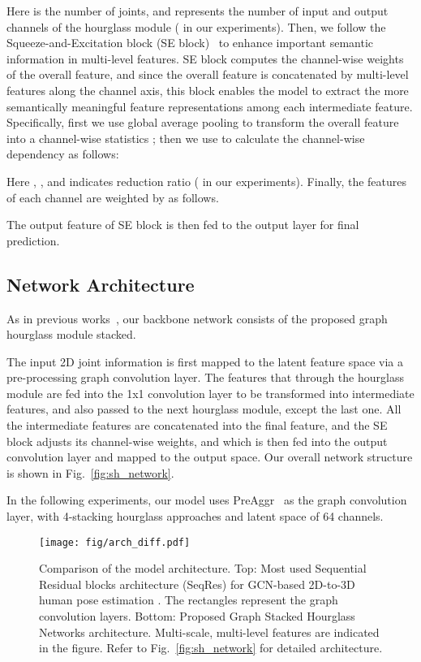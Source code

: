\documentclass[final]{cvpr}
\begin{document}
Here  is the number of joints, and  represents the number of input and output channels of the hourglass module ( in our experiments).
Then, we follow the Squeeze-and-Excitation block (SE block)~\cite{senet2018} to enhance important semantic information in multi-level features.
SE block computes the channel-wise weights of the overall feature, and since the overall feature is concatenated by multi-level features along the channel axis, 
this block enables the model to extract the more semantically meaningful feature representations among each intermediate feature.
Specifically, first we use global average pooling to transform the overall feature  into a channel-wise statistics ; then we use  to calculate the channel-wise dependency  as follows:

Here , , and  indicates reduction ratio ( in our experiments).
Finally, the features of each channel are weighted by  as follows.


The output feature of SE block  is then fed to the output layer for final prediction.


\subsection{Network Architecture}

As in previous works~\cite{Newell2016StackedHN, NIPS2017_8edd7215}, our backbone network consists of the proposed graph hourglass module stacked.

The input 2D joint information is first mapped to the latent feature space via a pre-processing graph convolution layer.
The features that through the hourglass module are fed into the 1x1 convolution layer to be transformed into intermediate features, and also passed to the next hourglass module, except the last one.
All the intermediate features are concatenated into the final feature, and the SE block adjusts its channel-wise weights, 
and which is then fed into the output convolution layer and mapped to the output space.
Our overall network structure is shown in Fig.~\ref{fig:sh_network}.

In the following experiments, our model uses PreAggr~\cite{Liu2020} as the graph convolution layer, with 4-stacking hourglass approaches and latent space of 64 channels.

\begin{figure}
\begin{center}
\texttt{[image: fig/arch\_diff.pdf]}
\end{center}
   \caption{Comparison of the model architecture.
   Top: Most used Sequential Residual blocks architecture (SeqRes) for GCN-based 2D-to-3D human pose estimation \cite{Liu2020,zhaoCVPR19semantic,wang2019gcn}. The rectangles represent the graph convolution layers.
   Bottom: Proposed Graph Stacked Hourglass Networks architecture. Multi-scale, multi-level features are indicated in the figure. Refer to Fig.~\ref{fig:sh_network} for detailed architecture.
   }
\label{fig:arch_diff}
\end{figure}
\end{document}

